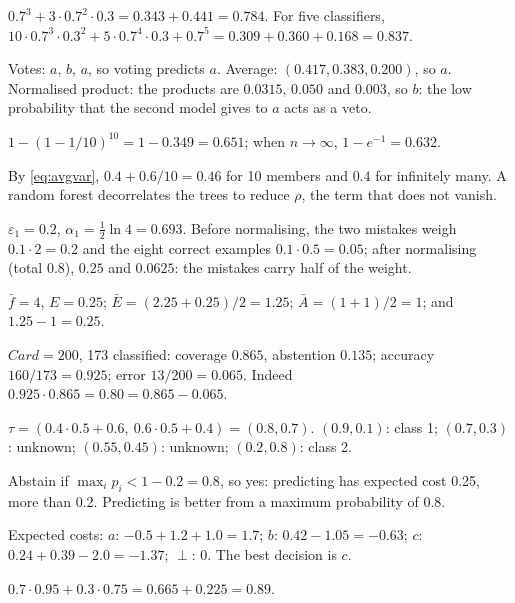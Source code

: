 \begin{description}[font=\bfseries,leftmargin=0pt,itemsep=5pt]
  \item[\ref{exr2:condorcet}] $0.7^3+3\cdot0.7^2\cdot0.3=0.343+0.441=0.784$. For five classifiers,
        $10\cdot0.7^3\cdot0.3^2+5\cdot0.7^4\cdot0.3+0.7^5=0.309+0.360+0.168=0.837$.
  \item[\ref{exr2:fusion}] Votes: $a$, $b$, $a$, so voting predicts $a$. Average:
        $(0.417,0.383,0.200)$, so $a$. Normalised product: the products are $0.0315$, $0.050$ and
        $0.003$, so $b$: the low probability that the second model gives to $a$ acts as a veto.
  \item[\ref{exr2:bootstrap}] $1-(1-1/10)^{10}=1-0.349=0.651$; when $n\to\infty$, $1-e^{-1}=0.632$.
  \item[\ref{exr2:variance}] By \cref{eq:avgvar}, $0.4+0.6/10=0.46$ for 10 members and $0.4$ for
        infinitely many. A random forest decorrelates the trees to reduce $\rho$, the term that does
        not vanish.
  \item[\ref{exr2:ada}] $\varepsilon_1=0.2$, $\alpha_1=\frac12\ln4=0.693$. Before normalising, the two
        mistakes weigh $0.1\cdot2=0.2$ and the eight correct examples $0.1\cdot0.5=0.05$; after
        normalising (total 0.8), $0.25$ and $0.0625$: the mistakes carry half of the weight.
  \item[\ref{exr2:ambiguity}] $\bar f=4$, $E=0.25$; $\bar E=(2.25+0.25)/2=1.25$;
        $\bar A=(1+1)/2=1$; and $1.25-1=0.25$.
  \item[\ref{exr2:cautious}] $\mathit{Card}=200$, 173 classified: coverage $0.865$, abstention
        $0.135$; accuracy $160/173=0.925$; error $13/200=0.065$. Indeed
        $0.925\cdot0.865=0.80=0.865-0.065$.
  \item[\ref{exr2:rule}] $\tau=(0.4\cdot0.5+0.6,\ 0.6\cdot0.5+0.4)=(0.8,0.7)$. $(0.9,0.1)$: class 1;
        $(0.7,0.3)$: unknown; $(0.55,0.45)$: unknown; $(0.2,0.8)$: class 2.
  \item[\ref{exr2:chow}] Abstain if $\max_ip_i<1-0.2=0.8$, so yes: predicting has expected cost
        0.25, more than 0.2. Predicting is better from a maximum probability of 0.8.
  \item[\ref{exr2:costcautious}] Expected costs: $a$: $-0.5+1.2+1.0=1.7$; $b$: $0.42-1.05=-0.63$;
        $c$: $0.24+0.39-2.0=-1.37$; $\perp$: 0. The best decision is $c$.
  \item[\ref{exr2:delegation}] $0.7\cdot0.95+0.3\cdot0.75=0.665+0.225=0.89$.

\end{description}
